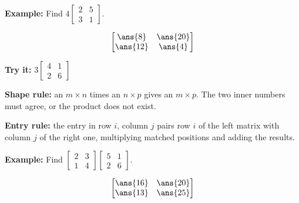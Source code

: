 \documentclass[12pt]{article}
\begin{document}
\begin{examplebox}
\textbf{Example:} \quad Find $4 \begin{bmatrix} 2 & 5 \\ 3 & 1 \end{bmatrix}$.

\[ \begin{bmatrix} \ans{8} & \ans{20} \\ \ans{12} & \ans{4} \end{bmatrix} \]
\end{examplebox}

\begin{tryitbox}
\textbf{Try it:} \quad $3 \begin{bmatrix} 4 & 1 \\ 2 & 6 \end{bmatrix}$\\[2pt]
\end{tryitbox}


\begin{formulabox}
\textbf{Shape rule:} an $m \times n$ times an $n \times p$ gives an $m \times p$. The two inner numbers must agree, or the product does not exist.\par
\textbf{Entry rule:} the entry in row $i$, column $j$ pairs row $i$ of the left matrix with column $j$ of the right one, multiplying matched positions and adding the results.
\end{formulabox}

\begin{examplebox}
\textbf{Example:} \quad Find $\begin{bmatrix} 2 & 3 \\ 1 & 4 \end{bmatrix}\begin{bmatrix} 5 & 1 \\ 2 & 6 \end{bmatrix}$.

\[ \begin{bmatrix} \ans{16} & \ans{20} \\ \ans{13} & \ans{25} \end{bmatrix} \]
\end{examplebox}
\end{document}
